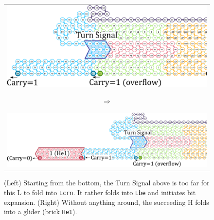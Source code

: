 \documentclass[twocolumn]{svjour3}
\begin{document}
%


\begin{figure}[tb]
\begin{tabular}{c}
 \begin{minipage}{0.35\linewidth}
\centering
\includegraphics[width=\linewidth]{fig/svg/CounterEx14_2.pdf}
\end{minipage}
\begin{minipage}{0.05\linewidth}
\centering
{\large $\Rightarrow$}
\end{minipage}
 \begin{minipage}{0.55\linewidth}
\centering
\includegraphics[width=\linewidth]{fig/svg/CounterEx15_2.pdf}
\end{minipage}
\end{tabular}

\caption{
(Left) Starting from the bottom, the Turn Signal above is too far for this L to fold into \texttt{Lcrn}.
It rather folds into \texttt{Lbe} and initiates bit expansion.
(Right) Without anything around, the succeeding H folds into a glider (brick \texttt{He1}).
}
\label{fig:overflowex2-3}
\end{figure}
\end{document}

